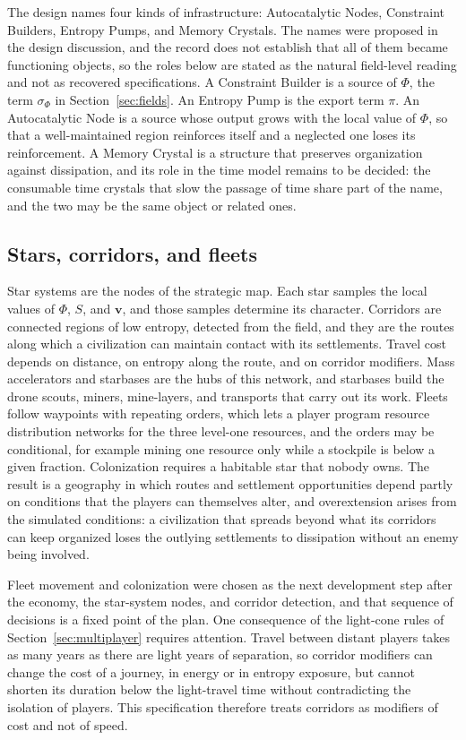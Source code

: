 \documentclass[11pt]{article}
\begin{document}
The design names four kinds of infrastructure: Autocatalytic Nodes, Constraint Builders, Entropy Pumps, and Memory Crystals. The names were proposed in the design discussion, and the record does not establish that all of them became functioning objects, so the roles below are stated as the natural field-level reading and not as recovered specifications. A Constraint Builder is a source of $\Phi$, the term $\sigma_\Phi$ in Section~\ref{sec:fields}. An Entropy Pump is the export term $\pi$. An Autocatalytic Node is a source whose output grows with the local value of $\Phi$, so that a well-maintained region reinforces itself and a neglected one loses its reinforcement. A Memory Crystal is a structure that preserves organization against dissipation, and its role in the time model remains to be decided: the consumable time crystals that slow the passage of time share part of the name, and the two may be the same object or related ones.

\subsection{Stars, corridors, and fleets}

Star systems are the nodes of the strategic map. Each star samples the local values of $\Phi$, $S$, and $\mathbf{v}$, and those samples determine its character. Corridors are connected regions of low entropy, detected from the field, and they are the routes along which a civilization can maintain contact with its settlements. Travel cost depends on distance, on entropy along the route, and on corridor modifiers. Mass accelerators and starbases are the hubs of this network, and starbases build the drone scouts, miners, mine-layers, and transports that carry out its work. Fleets follow waypoints with repeating orders, which lets a player program resource distribution networks for the three level-one resources, and the orders may be conditional, for example mining one resource only while a stockpile is below a given fraction. Colonization requires a habitable star that nobody owns. The result is a geography in which routes and settlement opportunities depend partly on conditions that the players can themselves alter, and overextension arises from the simulated conditions: a civilization that spreads beyond what its corridors can keep organized loses the outlying settlements to dissipation without an enemy being involved.

Fleet movement and colonization were chosen as the next development step after the economy, the star-system nodes, and corridor detection, and that sequence of decisions is a fixed point of the plan. One consequence of the light-cone rules of Section~\ref{sec:multiplayer} requires attention. Travel between distant players takes as many years as there are light years of separation, so corridor modifiers can change the cost of a journey, in energy or in entropy exposure, but cannot shorten its duration below the light-travel time without contradicting the isolation of players. This specification therefore treats corridors as modifiers of cost and not of speed.
\end{document}
